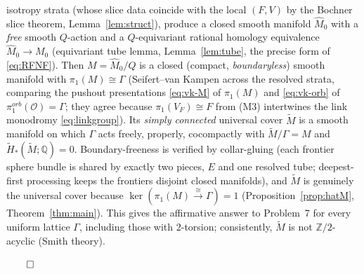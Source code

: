 \documentclass[12pt]{article}
\theoremstyle{definition}
\begin{document}
\begin{enumerate}
isotropy strata (whose slice data coincide with the local $(F,V)$ by the Bochner
slice theorem, Lemma~\ref{lem:struct}), produce a closed smooth manifold
$\widehat M_0$ with a \emph{free} smooth $Q$-action and a $Q$-equivariant
rational homology equivalence $\widehat M_0\to M_0$ (equivariant tube lemma,
Lemma~\ref{lem:tube}, the precise form of \eqref{eq:RFNF}). Then
$M=\widehat M_0/Q$ is a closed (compact, \emph{boundaryless}) smooth manifold
with $\pi_1(M)\cong\Gamma$ (Seifert--van Kampen across the resolved strata,
comparing the pushout presentations \eqref{eq:vk-M} of $\pi_1(M)$ and
\eqref{eq:vk-orb} of $\pi_1^{orb}(\mathcal O)=\Gamma$; they agree because
$\pi_1(V_F)\cong F$ from (M3) intertwines the link monodromy
\eqref{eq:linkgroup}). Its \emph{simply connected} universal cover $\widetilde M$
is a smooth manifold on which $\Gamma$ acts freely, properly, cocompactly with
$\widetilde M/\Gamma=M$ and $\widetilde H_*(\widetilde M;\mathbb{Q})=0$.
Boundary-freeness is verified by collar-gluing (each frontier sphere bundle is
shared by exactly two pieces, $E$ and one resolved tube; deepest-first
processing keeps the frontiers disjoint closed manifolds), and $\widetilde M$ is
genuinely the universal cover because $\ker(\pi_1(M)\xrightarrow{\cong}\Gamma)=1$
(Proposition~\ref{prop:hatM}, Theorem~\ref{thm:main}). This gives the affirmative answer to
Problem~7 for every uniform lattice $\Gamma$, including those with $2$-torsion;
consistently, $\widetilde M$ is not $\mathbb{Z}/2$-acyclic (Smith theory).
\end{enumerate}
\hfill$\qed$
\end{document}

